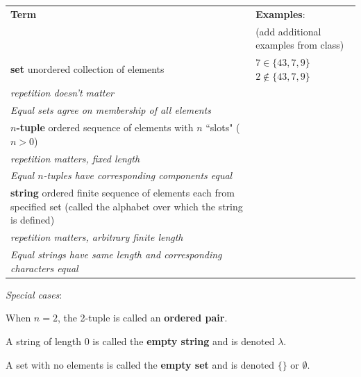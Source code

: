 
\begin{center}
    \begin{tabular}{|p{4.6in}p{2.6in}|}
    \hline
    {\bf  Term} & {\bf Examples}:\\
    &  (add additional examples from class)\\
    \hline 
    {\bf set} \newline
    unordered collection of elements & $7 \in \{43, 7, 9 \}$ \qquad $2 \notin \{43, 7, 9 \}$ \\
    {\it repetition doesn't matter} & \\
    {\it Equal sets agree on membership of all elements}& \\
    \hline
    {\bf $n$-tuple} \newline
    ordered sequence of elements with $n$ ``slots" ($n >0$) & \\
    {\it repetition matters, fixed length} &\\
    {\it Equal $n$-tuples have corresponding components equal}& \\
    \hline
    {\bf string} \newline
    ordered finite sequence of elements each from specified
    set (called the alphabet over which the string is defined)& \\
    {\it repetition matters, arbitrary finite length} &\\
    {\it Equal strings have same length and corresponding characters equal}\\
    \hline
    \end{tabular}
\end{center}

{\it Special cases}: 

When $n=2$, the 2-tuple is called an {\bf ordered pair}.

A string of length $0$ is called the {\bf empty string} and is denoted $\lambda$.

A set with no elements is called the {\bf empty set} and is denoted $\{\}$ or $\emptyset$.